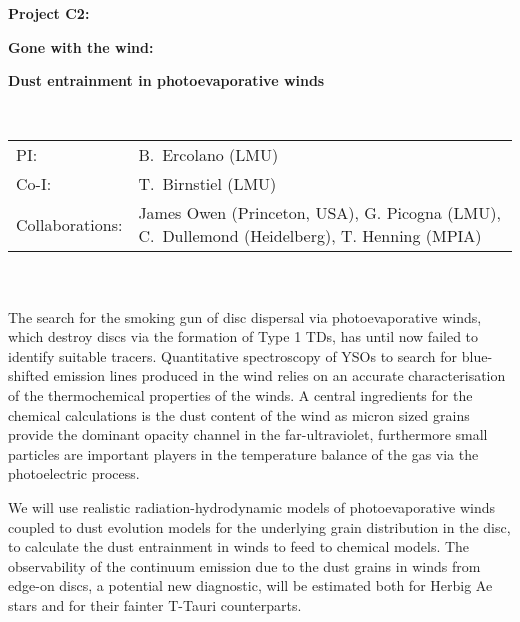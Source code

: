\documentclass[10pt,fleqn,twoside]{article}
\newcommand{\Tcol}{\color{blue}}
\begin{document}
\newpage


\setcounter{page}{1}

\centerline{\huge\bf\Tcol
%
%
%
%
%
 Project C2:}

\centerline{\huge\bf\Tcol Gone with the wind:}
\centerline{\huge\bf\Tcol Dust entrainment in photoevaporative winds}

%
%
%
%
%
\vskip1.0cm


\\
\begin{tabular}{ll}
{\textsf{PI:}}                   & B.~Ercolano (LMU) \\
{\textsf{Co-I:}}                & T.~Birnstiel (LMU)\\
{\textsf{Collaborations:}}      &  James Owen (Princeton, USA),
                                   G. Picogna (LMU),  C.~Dullemond
                                  (Heidelberg), T. Henning (MPIA)\\

\end{tabular}


\vspace{1em}
 \\

\vspace{1em}
\\

The search for the smoking gun of disc dispersal via photoevaporative
winds, which destroy discs via the formation of Type 1 TDs,  has until
now failed to identify suitable tracers. Quantitative spectroscopy of
YSOs to search for blue-shifted emission lines produced in the wind
relies on an accurate characterisation of the thermochemical
properties of the winds. A central ingredients for the chemical
calculations is the dust content of the wind as micron sized grains
provide the dominant opacity channel in the far-ultraviolet,
furthermore small particles are important players in the temperature
balance of the gas via the photoelectric process.  

We will use realistic radiation-hydrodynamic models of
photoevaporative winds coupled to dust evolution models for the
underlying grain distribution in the disc, to calculate the dust
entrainment in winds to feed to chemical models. The observability of
the continuum emission due to the dust grains in winds from edge-on
discs, a potential new diagnostic, will be estimated both for Herbig
Ae stars and for their fainter T-Tauri counterparts.  
\end{document}
